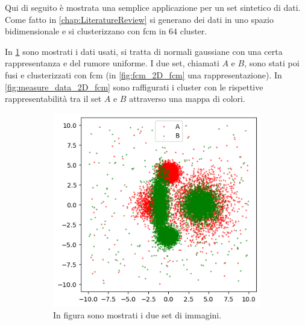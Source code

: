 \noindent Qui di seguito è mostrata una semplice applicazione per un set sintetico di dati. Come fatto in \cref{chap:LiteratureReview} si generano dei dati in uno spazio bidimensionale e si clusterizzano con \gls{fcm} in $64$ cluster.

\noindent In \cref{fig:fused_data_2D_fcm} sono mostrati i dati usati, si tratta di normali gaussiane con una certa rappresentanza e del rumore uniforme. I due set, chiamati $A$ e $B$, sono stati poi fusi e clusterizzati con \gls{fcm} (in \cref{fig:fcm_2D_fcm} una rappresentazione). In \cref{fig:measure_data_2D_fcm} sono raffigurati i cluster con le rispettive rappresentabilità tra il set $A$ e $B$ attraverso una mappa di colori.

\newpage
\begin{figure}[H]
	\centering
	\begin{subfigure}{0.45\linewidth}
		\includegraphics[width=\linewidth]{Figures/fused_data_2D_fcm.png}
		\caption[Application of fcm distance - fused data]{In figura sono mostrati i due set di immagini. \vspace{3.50em}}
		\label{fig:fused_data_2D_fcm}
	\end{subfigure}
	\hfill
	\begin{subfigure}{0.45\linewidth}

\end{subfigure}
\end{figure}
